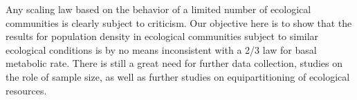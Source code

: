 Any scaling law based on the behavior of a limited number of ecological
communities is clearly subject to criticism.  Our objective here is
to show that the results for population density in ecological communities
subject to similar ecological conditions is by no means inconsistent
with a 2/3 law for basal metabolic rate.  There is still a great need
for further data collection, studies on the role of sample size\cite{woman},
as well as further studies on equipartitioning of ecological resources.
